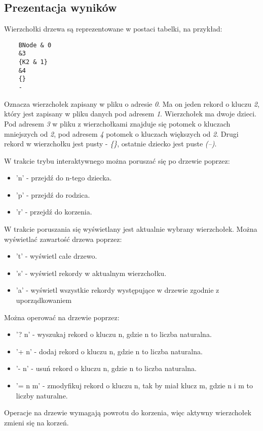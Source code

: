 \documentclass{article}
\begin{document}
    \subsection{Prezentacja wyników}
    Wierzchołki drzewa są reprezentowane w postaci tabelki, na przykład:
    \begin{lstlisting}
    BNode & 0
    &3
    {K2 & 1}
    &4
    {}
    -
    \end{lstlisting}
    Oznacza wierzchołek zapisany w pliku o adresie \emph{0}. Ma on jeden rekord o kluczu \emph{2},
    który jest zapisany w pliku danych pod adresem \emph{1}. Wierzchołek ma dwoje dzieci.
    Pod adresem \emph{3} w pliku z wierzchołkami znajduje się potomek o kluczach mniejszych
    od \emph{2}, pod adresem \emph{4} potomek o kluczach większych od \emph{2}. Drugi rekord w wierzchołku
    jest pusty - \emph{\{\}}, ostatnie dziecko jest puste \emph{(--)}.

    W trakcie trybu interaktywnego można poruszać się po drzewie poprzez:
    \begin{itemize}
    \item 'n' - przejdź do n-tego dziecka.
    \item 'p' - przejdź do rodzica.
    \item 'r' - przejdź do korzenia.
    \end{itemize}
    W trakcie poruszania się wyświetlany jest aktualnie wybrany wierzchołek.
    Można wyświetlać zawartość drzewa poprzez:
    \begin{itemize}
    \item 't' - wyświetl całe drzewo.
    \item 's' - wyświetl rekordy w aktualnym wierzchołku.
    \item 'a' - wyświetl wszystkie rekordy występujące w drzewie zgodnie z uporządkowaniem
    \end{itemize}
    Można operować na drzewie poprzez:
    \begin{itemize}
    \item '? n' - wyszukaj rekord o kluczu n, gdzie n to liczba naturalna.
    \item '+ n' - dodaj rekord o kluczu n, gdzie n to liczba naturalna.
    \item '- n' - usuń rekord o kluczu n, gdzie n to liczba naturalna.
    \item '= n m' - zmodyfikuj rekord o kluczu n, tak by miał klucz m, gdzie n i m to liczby naturalne.
    \end{itemize}
    Operacje na drzewie wymagają powrotu do korzenia, więc aktywny wierzchołek 
    zmieni się na korzeń.
\end{document}
